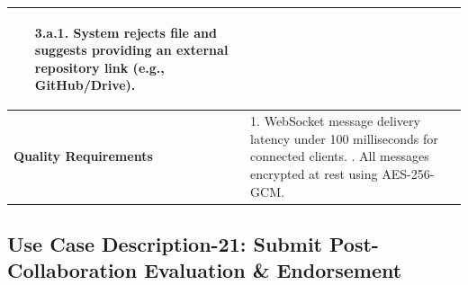 \begin{table}[H]
\begin{tabularx}{\textwidth}{|l|X|}
\begin{itemize}[leftmargin=*]
    \begin{itemize}[leftmargin=*]
        \item[3.a.1.] System rejects file and suggests providing an external repository link (e.g., GitHub/Drive).
    \end{itemize}
\end{itemize} \\ \hline
\textbf{Quality Requirements} & 
1. WebSocket message delivery latency under 100 milliseconds for connected clients. \newline
2. All messages encrypted at rest using AES-256-GCM. \\ \hline
\end{tabularx}
\end{table}

\clearpage
\subsection{Use Case Description-21: Submit Post-Collaboration Evaluation \& Endorsement}
\label{subsec:uc21}

